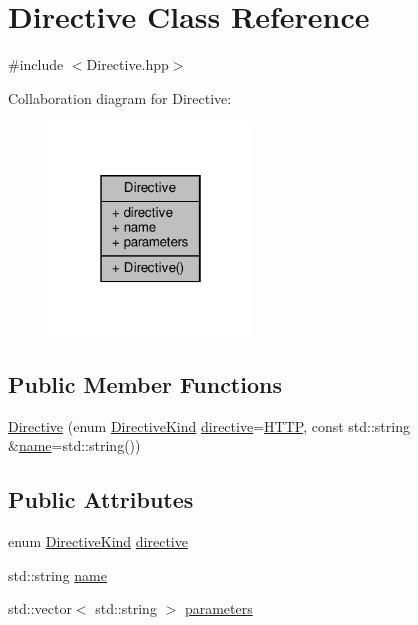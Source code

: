 \hypertarget{classft_1_1_directive}{}\section{Directive Class Reference}
\label{classft_1_1_directive}


{\ttfamily \#include $<$Directive.\+hpp$>$}



Collaboration diagram for Directive\+:
\nopagebreak
\begin{figure}[H]
\begin{center}
\leavevmode
\includegraphics[width=154pt]{classft_1_1_directive__coll__graph}
\end{center}
\end{figure}
\subsection*{Public Member Functions}
\begin{DoxyCompactItemize}
\item 
\hyperlink{classft_1_1_directive_aedcc052461811957b6a8610e0c72968d}{Directive} (enum \hyperlink{namespaceft_a5a5554dff10f0dc50bae4cc5825ad75d}{Directive\+Kind} \hyperlink{classft_1_1_directive_ad974f853279afa5ad30a28773b94fe87}{directive}=\hyperlink{namespaceft_a5a5554dff10f0dc50bae4cc5825ad75da67e044074f46e6cea22788527da5f02e}{H\+T\+TP}, const std\+::string \&\hyperlink{classft_1_1_directive_a9b45b3e13bd9167aab02e17e08916231}{name}=std\+::string())
\end{DoxyCompactItemize}
\subsection*{Public Attributes}
\begin{DoxyCompactItemize}
\item 
enum \hyperlink{namespaceft_a5a5554dff10f0dc50bae4cc5825ad75d}{Directive\+Kind} \hyperlink{classft_1_1_directive_ad974f853279afa5ad30a28773b94fe87}{directive}
\item 
std\+::string \hyperlink{classft_1_1_directive_a9b45b3e13bd9167aab02e17e08916231}{name}
\item 
std\+::vector$<$ std\+::string $>$ \hyperlink{classft_1_1_directive_a2197fbfab6b0ae80e5599c8ddc562479}{parameters}
\end{DoxyCompactItemize}


